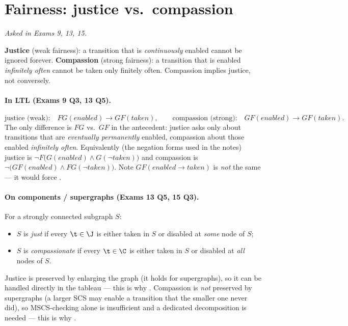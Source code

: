 \documentclass[oneside]{academica}
\begin{document}
\section{Fairness: justice vs.\ compassion}
\emph{Asked in Exams 9, 13, 15.}

\textbf{Justice} (weak fairness): a transition that is \emph{continuously}
enabled cannot be ignored forever. \textbf{Compassion} (strong fairness):
a transition that is enabled \emph{infinitely often} cannot be taken only
finitely often. Compassion implies justice, not conversely.

\paragraph{In LTL (Exams 9 Q3, 13 Q5).}
\[
  \text{justice (weak):}\quad FG(\mathit{enabled})\rightarrow GF(\mathit{taken}),
  \qquad
  \text{compassion (strong):}\quad GF(\mathit{enabled})\rightarrow GF(\mathit{taken}).
\]
The only difference is $FG$ vs.\ $GF$ in the antecedent: justice asks
only about transitions that are \emph{eventually permanently} enabled,
compassion about those enabled \emph{infinitely often}. Equivalently (the
negation forms used in the notes) justice is $\neg F\big(G(\mathit{enabled})\wedge
G(\neg\mathit{taken})\big)$ and compassion is
$\neg\big(GF(\mathit{enabled})\wedge FG(\neg\mathit{taken})\big)$. Note
$GF(\mathit{enabled}\rightarrow\mathit{taken})$ is \emph{not} the same ---
it would force .

\paragraph{On components / supergraphs (Exams 13 Q5, 15 Q3).}
For a strongly connected subgraph $S$:
\begin{itemize}
  \item $S$ is \emph{just} if every $\t\in\J$ is either taken in $S$ or
    disabled at \emph{some} node of $S$;
  \item $S$ is \emph{compassionate} if every $\t\in\C$ is either taken in
    $S$ or disabled at \emph{all} nodes of $S$.
\end{itemize}
Justice is preserved by enlarging the graph (it holds for supergraphs),
so it can be handled directly in the tableau --- this is why
. Compassion is \emph{not}
preserved by supergraphs (a larger SCS may enable a transition that the
smaller one never did), so MSCS-checking alone is insufficient and a
dedicated decomposition is needed --- this is why .
\end{document}

